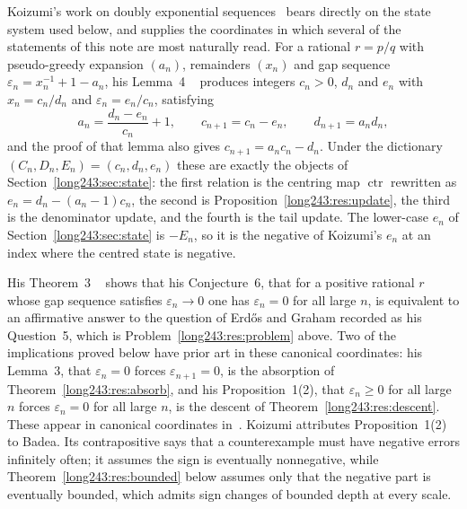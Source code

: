 \documentclass[11pt]{article}
\newcommand{\ctr}{\operatorname{ctr}}
\begin{document}
Koizumi's work on doubly exponential sequences~\cite{koizumi2025} bears
directly on the state system used below, and supplies the coordinates in which
several of the statements of this note are most naturally read.  For a rational
$r=p/q$ with pseudo-greedy expansion $(a_n)$, remainders $(x_n)$ and gap
sequence $\varepsilon_n=x_n^{-1}+1-a_n$, his Lemma~4
~\cite[pp.~11--12]{koizumi2025} produces integers $c_n>0$,
$d_n$ and $e_n$ with $x_n=c_n/d_n$ and $\varepsilon_n=e_n/c_n$, satisfying
\[
 a_n=\frac{d_n-e_n}{c_n}+1,\qquad
 c_{n+1}=c_n-e_n,\qquad
 d_{n+1}=a_nd_n ,
\]
and the proof of that lemma also gives $c_{n+1}=a_nc_n-d_n$.  Under the
dictionary $(C_n,D_n,E_n)=(c_n,d_n,e_n)$ these are exactly the objects of
Section~\ref{long243:sec:state}: the first relation is the centring map $\ctr$ rewritten
as $e_n=d_n-(a_n-1)c_n$, the second is Proposition~\ref{long243:res:update}, the third
is the denominator update, and the fourth is the tail update.  The lower-case
$e_n$ of Section~\ref{long243:sec:state} is $-E_n$, so it is the negative of Koizumi's
$e_n$ at an index where the centred state is negative.

His Theorem~3
~\cite[pp.~12--13]{koizumi2025} shows
that his Conjecture~6, that for a positive rational $r$ whose gap sequence
satisfies $\varepsilon_n\to0$ one has $\varepsilon_n=0$ for all large $n$,
is equivalent to an affirmative answer to the question of Erd\H{o}s and Graham
recorded as his Question~5, which is Problem~\ref{long243:res:problem} above.
Two of the implications proved below have prior art in these canonical
coordinates: his Lemma~3, that $\varepsilon_n=0$ forces $\varepsilon_{n+1}=0$,
is the absorption of Theorem~\ref{long243:res:absorb}, and his Proposition~1(2), that
$\varepsilon_n\ge0$ for all large $n$ forces $\varepsilon_n=0$ for all large
$n$, is the descent of Theorem~\ref{long243:res:descent}.  These appear in canonical
coordinates in~\cite[Lemma~3, p.~10; Prop.~1(2), pp.~14--15]{koizumi2025}.
Koizumi attributes Proposition~1(2) to Badea.  Its contrapositive says that a
counterexample must have negative errors infinitely often; it assumes the sign
is eventually nonnegative, while Theorem~\ref{long243:res:bounded} below assumes only
that the negative part is eventually bounded, which admits sign changes of
bounded depth at every scale.
\end{document}
